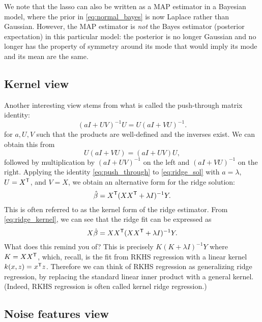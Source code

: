 \documentclass{article}
\begin{document}
We note that the lasso can also be written as a MAP estimator in a Bayesian 
model, where the prior in \eqref{eq:normal_bayes} is now Laplace rather than  
Gaussian. However, the MAP estimator is \emph{not} the Bayes estimator
(posterior expectation) in this particular model: the posterior is no longer
Gaussian and no longer has the property of symmetry around its mode that would
imply its mode and its mean are the same.   

\subsection{Kernel view}

Another interesting view stems from what is called the push-through matrix
identity:
\begin{equation}
\label{eq:push_through}
(aI + UV)^{-1} U = U (aI + VU)^{-1}.
\end{equation}
for $a,U,V$ such that the products are well-defined and the inverses exist. We
can obtain this from
\[
U (aI + VU) = (aI + UV) U,
\]
followed by multiplication by $(aI + UV)^{-1}$ on the left and $(aI + VU)^{-1}$
on the right. Applying the identity \eqref{eq:push_through} to
\eqref{eq:ridge_sol} with $a=\lambda$, $U=X^{\mathsf{T}}$, and $V=X$, we obtain an
alternative form for the ridge solution:  
\begin{equation}
\label{eq:ridge_kernel}
\hat{\beta} = X^{\mathsf{T}} (XX^{\mathsf{T}} + \lambda I)^{-1} Y.
\end{equation}
This is often referred to as the kernel form of the ridge estimator. From
\eqref{eq:ridge_kernel}, we can see that the ridge fit can be expressed as
\[
X\hat{\beta} = XX^{\mathsf{T}} (XX^{\mathsf{T}} + \lambda I)^{-1} Y.
\]
What does this remind you of? This is precisely $K(K + \lambda I)^{-1} Y$ where
$K = XX^{\mathsf{T}}$, which, recall, is the fit from RKHS regression with a linear kernel 
$k(x,z) = x^{\mathsf{T}} z$. Therefore we can think of RKHS regression as generalizing
ridge regression, by replacing the standard linear inner product with a general
kernel. (Indeed, RKHS regression is often called kernel ridge regression.)

\subsection{Noise features view}

\def\asto{\overset{\mathrm{as}}{\to}}
\end{document}
